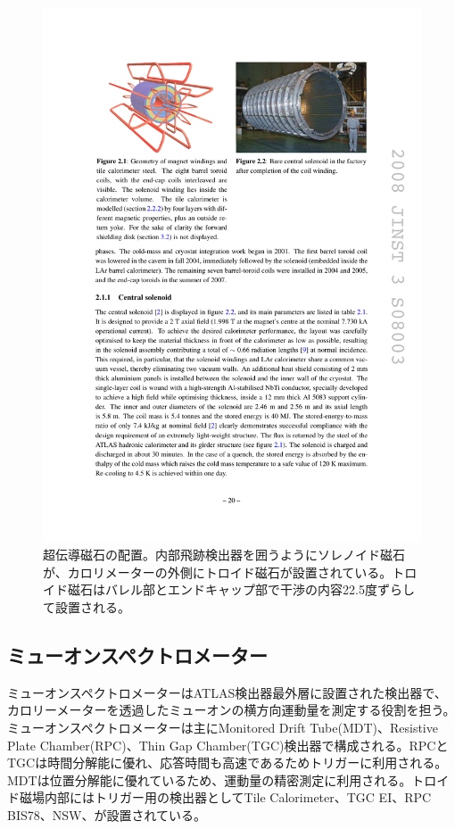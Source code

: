 \begin{figure} 
    \centering
    \includegraphics[width=16cm]{fig/Intro/ATLASmagnet.pdf}
    \caption[超伝導磁石の配置]{超伝導磁石の配置\cite{JINST:2008}。内部飛跡検出器を囲うようにソレノイド磁石が、カロリメーターの外側にトロイド磁石が設置されている。トロイド磁石はバレル部とエンドキャップ部で干渉の内容22.5度ずらして設置される。}
    \label{ATLASmagnet}
\end{figure}


\subsection{ミューオンスペクトロメーター}
ミューオンスペクトロメーターはATLAS検出器最外層に設置された検出器で、カロリーメーターを透過したミューオンの横方向運動量を測定する役割を担う。ミューオンスペクトロメーターは主にMonitored Drift Tube(MDT)、Resistive Plate Chamber(RPC)、Thin Gap Chamber(TGC)検出器で構成される。RPCとTGCは時間分解能に優れ、応答時間も高速であるためトリガーに利用される。MDTは位置分解能に優れているため、運動量の精密測定に利用される。トロイド磁場内部にはトリガー用の検出器としてTile Calorimeter、TGC EI、RPC BIS78、NSW、が設置されている。

